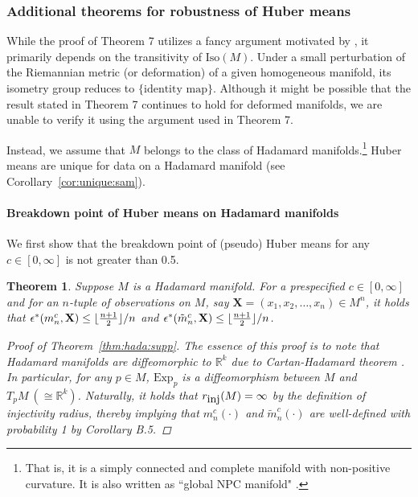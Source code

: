 \documentclass[preprint]{imsart}
\DeclarePairedDelimiter\floor{\lfloor}{\rfloor}
\theoremstyle{plain}
\newtheorem{theorem}{Theorem}
\theoremstyle{remark}
\begin{document}
\begin{appendix}
\subsubsection{Additional theorems for robustness of Huber means}

While the proof of Theorem 7 utilizes a fancy argument motivated by \citep[Theorem 2.1,][]{lopuhaa1991breakdown}, it primarily depends on the transitivity of $\mbox{Iso}(M)$. Under a small perturbation of the Riemannian metric (or deformation) of a given homogeneous manifold, its isometry group reduces to $\{\mbox{identity map}\}$. Although it might be possible that the result stated in Theorem 7 continues to hold for deformed manifolds, we are unable to verify it using the argument used in Theorem 7. 

Instead, we assume that $M$ belongs to the class of Hadamard manifolds.\footnote{That is, it is a simply connected and complete manifold with non-positive curvature. It is also written as ``global NPC manifold" \citep[Proposition 3.1,][]{sturm2003probability}.} 
Huber means are unique for data on a Hadamard manifold (see Corollary~\ref{cor:unique:sam}). 

\paragraph{Breakdown point of Huber means on Hadamard manifolds}
We first show that the breakdown point of (pseudo) Huber means for any $c \in [0, \infty]$ is not greater than 0.5.

\begin{theorem}
Suppose $M$ is a Hadamard manifold. For a prespecified $c \in [0, \infty]$ and for an $n$-tuple of observations on $M$, say $\textbf{X}=(x_1, x_2, \ldots, x_n)\in M^n$, it holds that  $\epsilon^{*}(m^{c}_{n},\mathbf{X})\le \floor{\frac{n+1}{2}}/n$ and $\epsilon^{*}(\tilde{m}^{c}_{n},\mathbf{X}) \le \floor{\frac{n+1}{2}}/n$. 
\begin{proof}[Proof of Theorem~\ref{thm:hada:supp}]

The essence of this proof is to note that Hadamard manifolds are diffeomorphic to $\mathbb{R}^{k}$ due to Cartan-Hadamard theorem \citep[e.g., see Theorem 1.10,][]{lee2006riemannian}. In particular, for any $p \in M$, $\mbox{Exp}_{p}$ is a diffeomorphism between $M$ and $T_{p}M ~(\cong \mathbb{R}^{k})$. Naturally, it holds that $r_{\mbox{\tiny inj}}(M)=\infty$ by the definition of injectivity radius, thereby implying that $m^{c}_{n}(\cdot)$ and $\tilde{m}^{c}_{n}(\cdot)$ are well-defined with probability 1 by Corollary B.5.


\end{proof}
\end{theorem}
\end{appendix}
\end{document}

